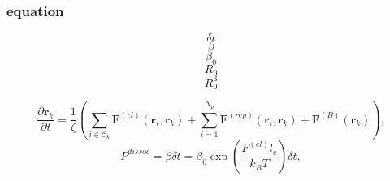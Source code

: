 \documentclass[slidestop, compress, mathserif]{beamer}
\begin{document}

\begin{frame}
  \frametitle<presentation>{equation}
  $$ \delta t$$
$$ \beta $$
$$ \beta_0 $$
$$ R_0 $$
$$ R_0^3 $$

  \begin{equation}
    \frac{\partial \mathbf{r}_k}{\partial t} = \frac{1}{\zeta} \left(\sum_{i\in\mathscr{C}_k} \mathbf{F}^{(el)}(\mathbf{r}_{i}, \mathbf{r}_k) + \sum_{i=1}^{N_p}\mathbf{F}^{(rep)}(\mathbf{r}_i, \mathbf{r}_k) + \mathbf{F}^{(B)}(\mathbf{r}_k)\right),
  \end{equation}
  \begin{equation}
    P^{dissoc} = \beta\delta t = \beta_0 \exp\left(\frac{F^{(el)}l_c}{k_BT}\right)\delta t,
  \end{equation}
\end{frame}
\end{document}
